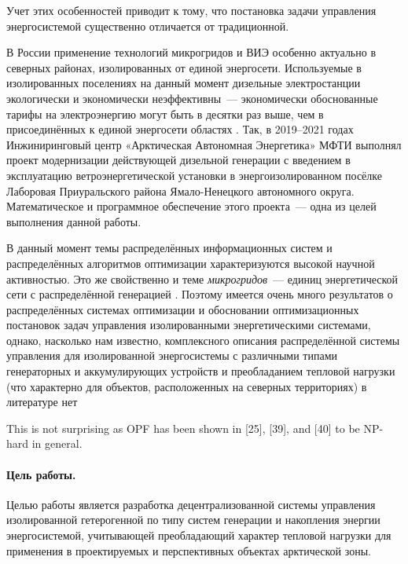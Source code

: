 Учет этих особенностей приводит к тому, что постановка задачи управления энергосистемой существенно отличается от традиционной.

В России применение технологий микрогридов и ВИЭ особенно актуально в северных районах, изолированных от единой энергосети.
Используемые в изолированных поселениях на данный момент дизельные электростанции экологически и экономически неэффективны~--- экономически обоснованные тарифы на электроэнергию могут быть в десятки раз выше, чем в присоединённых к единой энергосети областях \cite[15]{ancenter2017tarifes}.
Так, в 2019--2021 годах Инжиниринговый центр «Арктическая Автономная Энергетика» МФТИ выполнял проект модернизации действующей дизельной генерации с введением в эксплуатацию ветроэнергетической установки в энергоизолированном посёлке Лаборовая Приуральского района Ямало-Ненецкого автономного округа.
Математическое и программное обеспечение этого проекта~--- одна из целей выполнения данной работы.

В данный момент темы распределённых информационных систем и распределённых алгоритмов оптимизации характеризуются высокой научной активностью.
Это же свойственно и теме \textit{микрогридов}~--- единиц энергетической сети с распределённой генерацией \cite{lasseter2002microgrids}.
Поэтому имеется очень много результатов о распределённых системах оптимизации и обосновании оптимизационных постановок задач управления изолированными энергетическими системами, однако, насколько нам известно, комплексного описания распределённой системы управления для изолированной энергосистемы с различными типами генераторных и аккумулирующих устройств и преобладанием тепловой нагрузки (что характерно для объектов, расположенных на северных территориях) в литературе нет


This is not surprising as OPF has been
shown in [25], [39], and [40] to be NP-hard in general. \cite{lehmann2015ac}

 
 
 \paragraph{Цель работы.}
 Целью работы является разработка децентрализованной системы управления изолированной гетерогенной по типу систем генерации и накопления энергии энергосистемой, учитывающей преобладающий характер тепловой нагрузки для применения в проектируемых и перспективных объектах арктической зоны.
 
